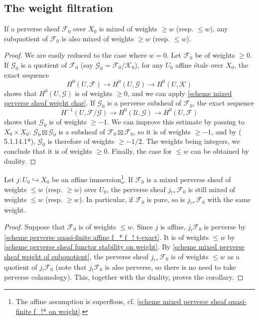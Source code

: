 \subsection{The weight filtration}
\begin{proposition}\label{scheme mixed perverse sheaf weight of subquotient}
If a perverse sheaf $\mathscr{F}_0$ over $X_0$ is mixed of weights $\geq w$ (resp. $\leq w$), any subquotient of $\mathscr{F}_0$ is also mixed of weights $\geq w$ (resp. $\leq w$).
\end{proposition}
\begin{proof}
We are easily reduced to the case where $w=0$. Let $\mathscr{F}_0$ be of weights $\geq 0$. If $\mathscr{G}_0$ is a quotient of $\mathscr{F}_0$ (say $\mathscr{G}_0=\mathscr{F}_0/\mathscr{K}_0$), for any $U_0$ affine \'etale over $X_0$, the exact sequence
\[H^0(U,\mathscr{F})\to H^0(U,\mathscr{G})\to H^0(U,\mathscr{K})\]
shows that $H^0(U,\mathscr{G})$ is of weights $\geq 0$, and we can apply \cref{scheme mixed perverse sheaf weight char}. If $\mathscr{G}_0$ is a perverse subsheaf of $\mathscr{F}_0$, the exact sequence
\[H^{-1}(U,\mathscr{F}/\mathscr{G})\to H^0(\mathscr{U},\mathscr{G})\to H^0(U,\mathscr{F})\]
shows that $\mathscr{G}_0$ is of weights $\geq -1$. We can improve this estimate by passing to $X_0\times X_0$: $\mathscr{G}_0\boxtimes\mathscr{G}_0$ is a subsheaf of $\mathscr{F}_0\boxtimes\mathscr{F}_0$, so it is of weights $\geq -1$, and by (\cite{BBD} 5.1.14.1*), $\mathscr{G}_0$ is therefore of weights $\geq -1/2$. The weights being integers, we conclude that it is of weights $\geq 0$. Finally, the case for $\leq w$ can be obtained by duality.
\end{proof}

\begin{corollary}\label{scheme mixed perverse sheaf weight under j_!* preverse}
Let $j:U_0\hookrightarrow X_0$ be an affine immersion\footnote{The affine assumption is superflous, cf. \cref{scheme mixed perverse sheaf quasi-finite f_!* on weight}.}. If $\mathscr{F}_0$ is a mixed perverse sheaf of weights $\leq w$ (resp. $\geq w$) over $U_0$, the perverse sheaf $j_{!*}\mathscr{F}_0$ is still mixed of weights $\leq w$ (resp. $\geq w$). In particular, if $\mathscr{F}_0$ is pure, so is $j_{!*}\mathscr{F}_0$ with the same weight.
\end{corollary}
\begin{proof}
Suppose that $\mathscr{F}_0$ is of weights $\leq w$. Since $j$ is affine, $j_!\mathscr{F}_0$ is perverse by \cref{scheme perverse quasi-finite affine f_* f_! t-exact}. It is of weights $\leq w$ by \cref{scheme perverse sheaf functor stability on weight}. By \cref{scheme mixed perverse sheaf weight of subquotient}, the perverse sheaf $j_{!*}\mathscr{F}_0$ is of weights $\leq w$ as a quotient of $j_!\mathscr{F}_0$ (note that $j_!\mathscr{F}_0$ is also perverse, so there is no need to take perverse cohomology). This, together with the duality, proves the corollary.
\end{proof}

